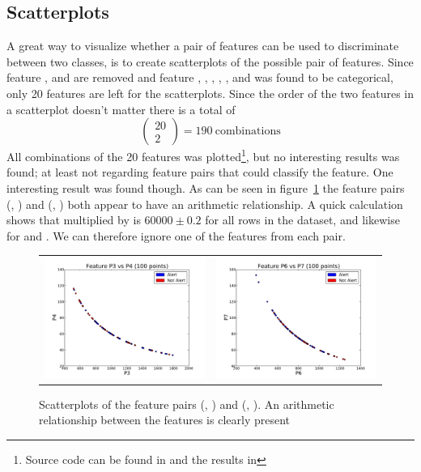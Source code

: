 \subsection{Scatterplots}\label{sec:scatterplots}
A great way to visualize whether a pair of features can be used to discriminate between two classes, is to create scatterplots of the possible pair of features. Since feature ,  and  are removed and feature , , , , ,  and  was found to be categorical, only 20 features are left for the scatterplots. Since the order of the two features in a scatterplot doesn't matter there is a total of 
\[
    \begin{pmatrix}
        20 \\
        2
    \end{pmatrix} = 190\:\text{combinations}
\]
All combinations of the 20 features was plotted\footnote{Source code can be found in  and the results in }, but no interesting results was found; at least not regarding feature pairs that could classify the  feature. One interesting result was found though. As can be seen in figure~\ref{fig:scatterplots} the feature pairs (, ) and (, ) both appear to have an arithmetic relationship. A quick calculation shows that  multiplied by  is $60000\pm0.2$ for all rows in the dataset, and likewise for  and . We can therefore ignore one of the features from each pair.
\begin{figure}
    \begin{tabularx}{\textwidth}{ X X }
        \includegraphics[width=.5\textwidth]{../sessions/24-writing-helper-scripts/plots/scatterplots/P3-P4.pdf} &
        \includegraphics[width=.5\textwidth]{../sessions/24-writing-helper-scripts/plots/scatterplots/P6-P7.pdf}
    \end{tabularx}
    \caption{Scatterplots of the feature pairs (, ) and (, ). An arithmetic relationship between the features is clearly present}\label{fig:scatterplots}
\end{figure}


